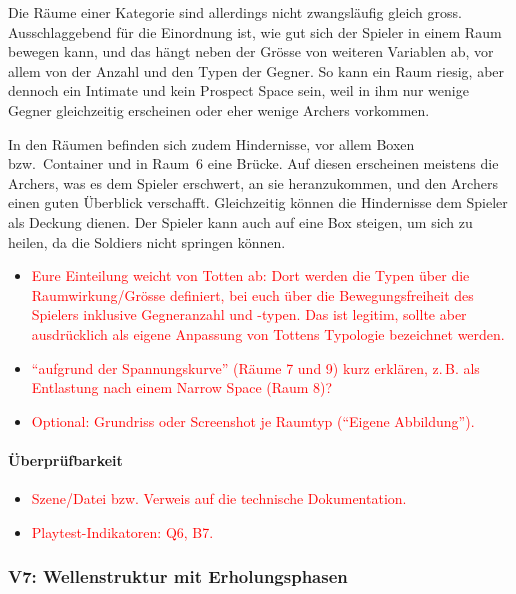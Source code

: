 \documentclass[../Main.tex]{subfiles}
\begin{document}
Die Räume einer Kategorie sind allerdings nicht zwangsläufig gleich gross. Ausschlaggebend für die Einordnung ist, wie gut sich der Spieler in einem Raum bewegen kann, und das hängt neben der Grösse von weiteren Variablen ab, vor allem von der Anzahl und den Typen der Gegner. So kann ein Raum riesig, aber dennoch ein Intimate und kein Prospect Space sein, weil in ihm nur wenige Gegner gleichzeitig erscheinen oder eher wenige Archers vorkommen.

In den Räumen befinden sich zudem Hindernisse, vor allem Boxen bzw.\ Container und in Raum~6 eine Brücke. Auf diesen erscheinen meistens die Archers, was es dem Spieler erschwert, an sie heranzukommen, und den Archers einen guten Überblick verschafft. Gleichzeitig können die Hindernisse dem Spieler als Deckung dienen. Der Spieler kann auch auf eine Box steigen, um sich zu heilen, da die Soldiers nicht springen können.

\begin{itemize}[leftmargin=1.5cm]
    \item \textcolor{red}{Eure Einteilung weicht von Totten ab: Dort werden die Typen über die Raumwirkung/Grösse definiert, bei euch über die Bewegungsfreiheit des Spielers inklusive Gegneranzahl und -typen. Das ist legitim, sollte aber ausdrücklich als eigene Anpassung von Tottens Typologie bezeichnet werden.}
    \item \textcolor{red}{\enquote{aufgrund der Spannungskurve} (Räume 7 und 9) kurz erklären, z.\,B. als Entlastung nach einem Narrow Space (Raum 8)?}
    \item \textcolor{red}{Optional: Grundriss oder Screenshot je Raumtyp (\enquote{Eigene Abbildung}).}
\end{itemize}

\paragraph{Überprüfbarkeit}
\begin{itemize}[leftmargin=1.5cm]
    \item \textcolor{red}{Szene/Datei bzw. Verweis auf die technische Dokumentation.}
    \item \textcolor{red}{Playtest-Indikatoren: Q6, B7.}
\end{itemize}

\subsubsection{V7: Wellenstruktur mit Erholungsphasen} \label{sec:V7}
\end{document}
